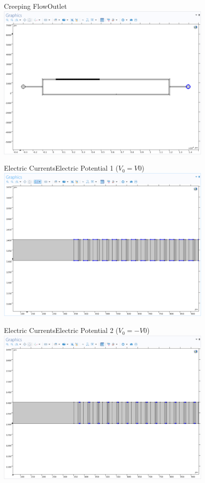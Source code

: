 \documentclass[11pt]{beamer}
\begin{document}
\begin{frame}{Creeping Flow}{Outlet}
    \includegraphics[width=0.8\textwidth]{13.png}
\end{frame}
\begin{frame}{Electric Currents}{Electric Potential 1 ($V_0=V0$)}
    \includegraphics[width=0.8\textwidth]{14.png}
\end{frame}
\begin{frame}{Electric Currents}{Electric Potential 2 ($V_0=-V0$)}
    \includegraphics[width=0.8\textwidth]{15.png}
\end{frame}
\end{document}
